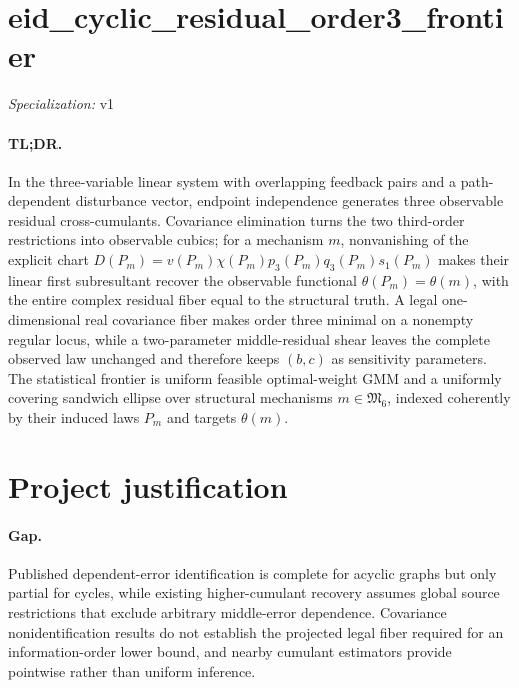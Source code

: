 \documentclass{article}
\begin{document}
\sloppy

\section*{eid\_\allowbreak{}cyclic\_\allowbreak{}residual\_\allowbreak{}order3\_\allowbreak{}frontier}

\noindent\textit{Specialization:} v1\par

\paragraph{TL;DR.} In the three-variable linear system with overlapping feedback pairs and a path-dependent disturbance vector, endpoint independence generates three observable residual cross-cumulants. Covariance elimination turns the two third-order restrictions into observable cubics; for a mechanism \(m\), nonvanishing of the explicit chart \(D(P_m)=v(P_m)\chi(P_m)p_3(P_m)q_3(P_m)s_1(P_m)\) makes their linear first subresultant recover the observable functional \(\theta(P_m)=\theta(m)\), with the entire complex residual fiber equal to the structural truth. A legal one-dimensional real covariance fiber makes order three minimal on a nonempty regular locus, while a two-parameter middle-residual shear leaves the complete observed law unchanged and therefore keeps \((b,c)\) as sensitivity parameters. The statistical frontier is uniform feasible optimal-weight GMM and a uniformly covering sandwich ellipse over structural mechanisms \(m\in\mathfrak M_6\), indexed coherently by their induced laws \(P_m\) and targets \(\theta(m)\).

\section{Project justification}

\paragraph{Gap.} Published dependent-error identification is complete for acyclic graphs but only partial for cycles, while existing higher-cumulant recovery assumes global source restrictions that exclude arbitrary middle-error dependence. Covariance nonidentification results do not establish the projected legal fiber required for an information-order lower bound, and nearby cumulant estimators provide pointwise rather than uniform inference.
\end{document}
